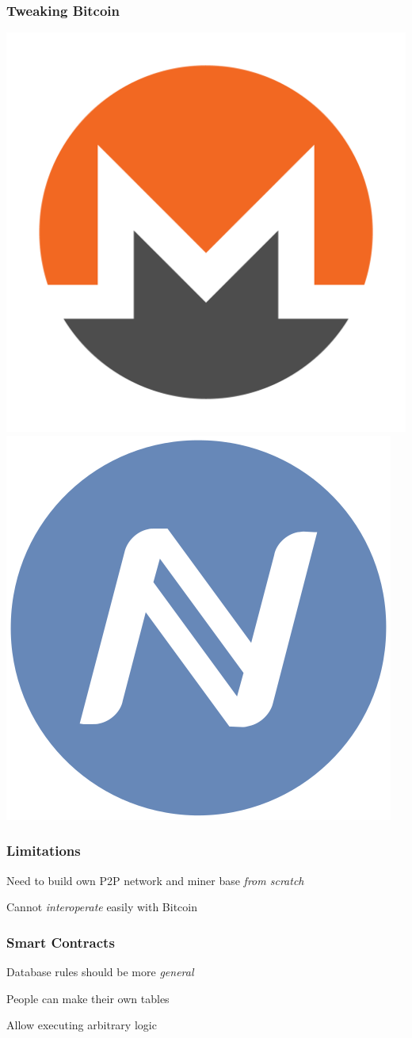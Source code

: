 \documentclass[aspectratio=169,17pt]{beamer}
\begin{document}
\begin{frame}
	\frametitle{Tweaking Bitcoin}

	\centering
	\includegraphics[width=.4\textwidth]{assets/monero-symbol-on-white-1280.png}
	\includegraphics[width=.4\textwidth]{assets/namecoin.png}
\end{frame}

\begin{frame}
	\frametitle{Limitations}
	Need to build own P2P network and miner base \emph{from scratch}

	Cannot \emph{interoperate} easily with Bitcoin
\end{frame}

\begin{frame}
	\frametitle{Smart Contracts}
	Database rules should be more \emph{general}

	People can make their own tables

	Allow executing arbitrary logic
\end{frame}
\end{document}
